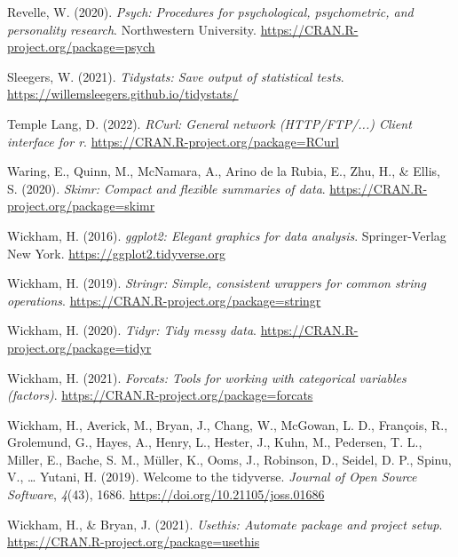 \documentclass[
  man,floatsintext]{apa7}
\newlength{\cslhangindent}
\newlength{\cslentryspacingunit} %
\newenvironment{CSLReferences}[2] %
 {%
  \setlength{\parindent}{0pt}
  \ifodd #1
  \let\oldpar\par
  \def\par{\hangindent=\cslhangindent\oldpar}
  \fi
  \setlength{\parskip}{#2\cslentryspacingunit}
 }%
 {}
\begin{document}
\begin{CSLReferences}{1}{0}
\leavevmode{}%
Revelle, W. (2020). \emph{Psych: Procedures for psychological, psychometric, and personality research}. Northwestern University. \url{https://CRAN.R-project.org/package=psych}

\leavevmode{}%
Sleegers, W. (2021). \emph{Tidystats: Save output of statistical tests}. \url{https://willemsleegers.github.io/tidystats/}

\leavevmode{}%
Temple Lang, D. (2022). \emph{RCurl: General network (HTTP/FTP/...) Client interface for r}. \url{https://CRAN.R-project.org/package=RCurl}

\leavevmode{}%
Waring, E., Quinn, M., McNamara, A., Arino de la Rubia, E., Zhu, H., \& Ellis, S. (2020). \emph{Skimr: Compact and flexible summaries of data}. \url{https://CRAN.R-project.org/package=skimr}

\leavevmode{}%
Wickham, H. (2016). \emph{ggplot2: Elegant graphics for data analysis}. Springer-Verlag New York. \url{https://ggplot2.tidyverse.org}

\leavevmode{}%
Wickham, H. (2019). \emph{Stringr: Simple, consistent wrappers for common string operations}. \url{https://CRAN.R-project.org/package=stringr}

\leavevmode{}%
Wickham, H. (2020). \emph{Tidyr: Tidy messy data}. \url{https://CRAN.R-project.org/package=tidyr}

\leavevmode{}%
Wickham, H. (2021). \emph{Forcats: Tools for working with categorical variables (factors)}. \url{https://CRAN.R-project.org/package=forcats}

\leavevmode{}%
Wickham, H., Averick, M., Bryan, J., Chang, W., McGowan, L. D., François, R., Grolemund, G., Hayes, A., Henry, L., Hester, J., Kuhn, M., Pedersen, T. L., Miller, E., Bache, S. M., Müller, K., Ooms, J., Robinson, D., Seidel, D. P., Spinu, V., \ldots{} Yutani, H. (2019). Welcome to the {tidyverse}. \emph{Journal of Open Source Software}, \emph{4}(43), 1686. \url{https://doi.org/10.21105/joss.01686}

\leavevmode{}%
Wickham, H., \& Bryan, J. (2021). \emph{Usethis: Automate package and project setup}. \url{https://CRAN.R-project.org/package=usethis}


\end{CSLReferences}
\end{document}
